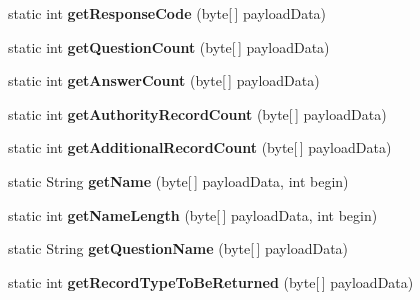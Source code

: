 \begin{DoxyCompactItemize}
\item 
\hypertarget{class_d_n_s_wrapper_a7a021ac7aa36e76fc881a338c80f64a9}{static int {\bfseries get\-Response\-Code} (byte\mbox{[}$\,$\mbox{]} payload\-Data)}\label{class_d_n_s_wrapper_a7a021ac7aa36e76fc881a338c80f64a9}

\item 
\hypertarget{class_d_n_s_wrapper_a8a252f916640dc58a87768a556a639c3}{static int {\bfseries get\-Question\-Count} (byte\mbox{[}$\,$\mbox{]} payload\-Data)}\label{class_d_n_s_wrapper_a8a252f916640dc58a87768a556a639c3}

\item 
\hypertarget{class_d_n_s_wrapper_aacafb3862fc1caa5818af0425ab0a992}{static int {\bfseries get\-Answer\-Count} (byte\mbox{[}$\,$\mbox{]} payload\-Data)}\label{class_d_n_s_wrapper_aacafb3862fc1caa5818af0425ab0a992}

\item 
\hypertarget{class_d_n_s_wrapper_a5a20729cdd1b4b65bcf981da9bba6dc5}{static int {\bfseries get\-Authority\-Record\-Count} (byte\mbox{[}$\,$\mbox{]} payload\-Data)}\label{class_d_n_s_wrapper_a5a20729cdd1b4b65bcf981da9bba6dc5}

\item 
\hypertarget{class_d_n_s_wrapper_a24bc39f1bfb9c1dd7b1f8c08cbacabe7}{static int {\bfseries get\-Additional\-Record\-Count} (byte\mbox{[}$\,$\mbox{]} payload\-Data)}\label{class_d_n_s_wrapper_a24bc39f1bfb9c1dd7b1f8c08cbacabe7}

\item 
\hypertarget{class_d_n_s_wrapper_a2ce34c0436d676999ea6a55f9483bad5}{static String {\bfseries get\-Name} (byte\mbox{[}$\,$\mbox{]} payload\-Data, int begin)}\label{class_d_n_s_wrapper_a2ce34c0436d676999ea6a55f9483bad5}

\item 
\hypertarget{class_d_n_s_wrapper_ad05adb87ba1b2c81dba89a9ff518db76}{static int {\bfseries get\-Name\-Length} (byte\mbox{[}$\,$\mbox{]} payload\-Data, int begin)}\label{class_d_n_s_wrapper_ad05adb87ba1b2c81dba89a9ff518db76}

\item 
\hypertarget{class_d_n_s_wrapper_a8a09ac178efce77bb228df732cc9836f}{static String {\bfseries get\-Question\-Name} (byte\mbox{[}$\,$\mbox{]} payload\-Data)}\label{class_d_n_s_wrapper_a8a09ac178efce77bb228df732cc9836f}

\item 
\hypertarget{class_d_n_s_wrapper_aa81adb4b7ac0158a3592d2522514bc38}{static int {\bfseries get\-Record\-Type\-To\-Be\-Returned} (byte\mbox{[}$\,$\mbox{]} payload\-Data)}\label{class_d_n_s_wrapper_aa81adb4b7ac0158a3592d2522514bc38}


\end{DoxyCompactItemize}

